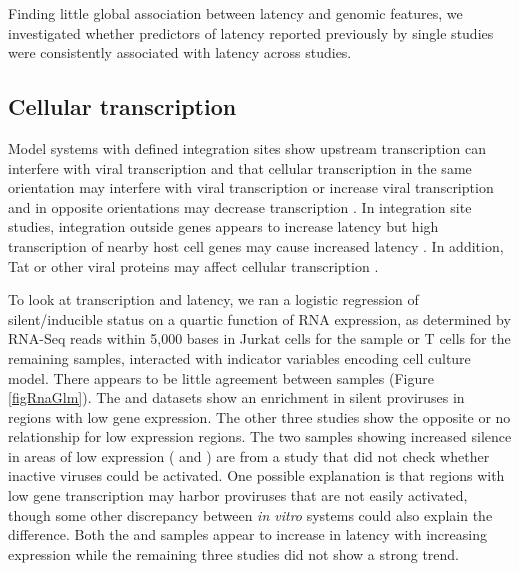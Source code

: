 \documentclass[../sherrill-Mix_thesis.tex]{subfiles}
\begin{document}
		Finding little global association between latency and genomic features, we investigated whether predictors of latency reported previously by single studies were consistently associated with latency across studies.

	\subsection{Cellular transcription}
		Model systems with defined integration sites show upstream transcription can interfere with viral transcription \citep{Greger1998} and that cellular transcription in the same orientation may interfere with viral transcription \citep{Lenasi2008} or increase viral transcription \citep{Han2008} and in opposite orientations may decrease transcription \citep{Han2008}. In integration site studies, integration outside genes appears to increase latency \citep{Lewinski2005} but high transcription of nearby host cell genes may cause increased latency \citep{Lewinski2005,Shan2011}. In addition, Tat or other viral proteins may affect cellular transcription \citep{Marco2008,Chang2011}. %

		To look at transcription and latency, we ran a logistic regression of silent/inducible status on a quartic function of RNA expression, as determined by RNA-Seq reads within 5,000 bases in Jurkat cells for the \Jurkat{} sample or \cdFour{} T cells for the remaining samples, interacted with indicator variables encoding cell culture model. There appears to be little agreement between samples (Figure \ref{figRnaGlm}). The \Resting{} and \Active{} datasets show an enrichment in silent proviruses in regions with low gene expression. The other three studies show the opposite or no relationship for low expression regions. The two samples showing increased silence in areas of low expression  (\Resting{} and \Active{}) are from a study that did not check whether inactive viruses could be activated. One possible explanation is that regions with low gene transcription may harbor proviruses that are not easily activated, though some other discrepancy between \textit{in vitro} systems could also explain the difference. Both the \Jurkat{} and \Active{} samples appear to increase in latency with increasing expression while the remaining three studies did not show a strong trend. 
\end{document}
